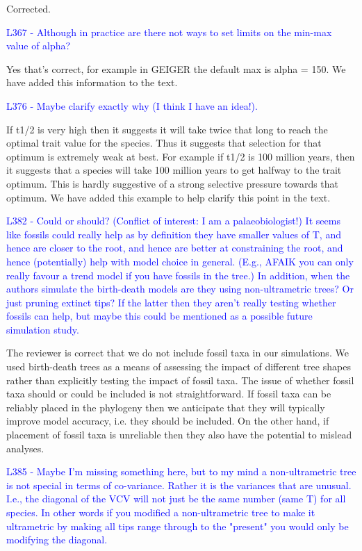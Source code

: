 \documentclass[12pt]{letter}
\begin{document}
\begin{letter}{}
Corrected.

\textcolor{blue}{L367 - Although in practice are there not ways to set limits on the min-max value of alpha?}

Yes that's correct, for example in GEIGER the default max is alpha = 150. We have added this information to the text. 

\textcolor{blue}{L376 - Maybe clarify exactly why (I think I have an idea!).}

If t1/2 is very high then it suggests it will take twice that long to reach the optimal trait value for the species. Thus it suggests that selection for that optimum is extremely weak at best. For example if t1/2 is 100 million years, then it suggests that a species will take 100 million years to get halfway to the trait optimum. This is hardly suggestive of a strong selective pressure towards that optimum. We have added this example to help clarify this point in the text.

\textcolor{blue}{L382 - Could or should? (Conflict of interest: I am a palaeobiologist!) It seems like fossils could really help as by definition they have smaller values of T, and hence are closer to the root, and hence are better at constraining the root, and hence (potentially) help with model choice in general. (E.g., AFAIK you can only really favour a trend model if you have fossils in the tree.) In addition, when the authors simulate the birth-death models are they using non-ultrametric trees? Or just pruning extinct tips? If the latter then they aren't really testing whether fossils can help, but maybe this could be mentioned as a possible future simulation study.}

The reviewer is correct that we do not include fossil taxa in our simulations. We used birth-death trees as a means of assessing the impact of different tree shapes rather than explicitly testing the impact of fossil taxa. The issue of whether fossil taxa should or could be included is not straightforward. If fossil taxa can be reliably placed in the phylogeny then we anticipate that they will typically improve model accuracy, i.e. they should be included. On the other hand, if placement of fossil taxa is unreliable then they also have the potential to mislead analyses. %

\textcolor{blue}{L385 - Maybe I'm missing something here, but to my mind a non-ultrametric tree is not special in terms of co-variance. Rather it is the variances that are unusual. I.e., the diagonal of the VCV will not just be the same number (same T) for all species. In other words if you modified a non-ultrametric tree to make it ultrametric by making all tips range through to the "present" you would only be modifying the diagonal.}


\end{letter}
\end{document}
